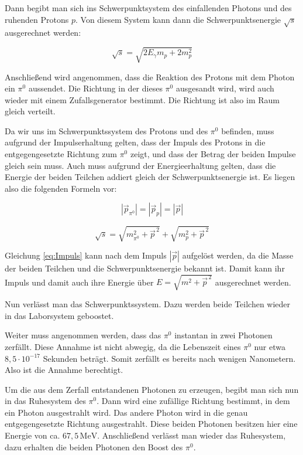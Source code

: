 \documentclass[a4paper,11pt,oneside,final,german,openbib,pdftex]{scrbook}
\begin{document}
{Dann begibt man sich ins Schwerpunktsystem des einfallenden Photons und des ruhenden Protons $p$. 
Von diesem System kann dann die Schwerpunktsenergie $\sqrt{s}$ ausgerechnet werden:

\begin{equation}
\sqrt{s}= \sqrt{2E_{\gamma}m_p+2m_p^2}
\end{equation}

Anschlie{\ss}end wird angenommen, dass die Reaktion des Protons mit dem Photon ein $\pi^0$ aussendet. Die Richtung in der dieses $\pi^0$ ausgesandt wird, wird auch wieder mit einem Zufallsgenerator bestimmt. Die Richtung ist also im Raum gleich verteilt.

Da wir uns im Schwerpunktssystem des Protons und des $\pi^0$ befinden, muss aufgrund der Impulserhaltung gelten, dass der Impuls des Protons in die entgegengesetzte Richtung zum $\pi^0$ zeigt, und dass der Betrag der beiden Impulse gleich sein muss. Auch muss aufgrund der Energieerhaltung gelten, dass die Energie der beiden Teilchen addiert gleich der Schwerpunktsenergie ist. Es liegen also die folgenden Formeln vor:


\begin{equation}
|\vec{p}_{\pi^0}|=|\vec{p}_p| = |\vec{p}| 
\end{equation}

\begin{equation}
 \sqrt{s}=\sqrt{m_{\pi^0}^2+\vec{p}^{\,2}} + \sqrt{m_{p}^2+\vec{p}^{\,2}}
\label{eq:Impuls}
\end{equation}


Gleichung \ref{eq:Impuls} kann nach dem Impuls $|\vec{p}|$ aufgel\"ost werden, da die Masse der beiden Teilchen und die Schwerpunktsenergie bekannt ist. Damit kann ihr Impuls und damit auch ihre Energie über $E=\sqrt{m^2+\vec{p}^{\,2}}$ ausgerechnet werden. 

Nun verl\"asst man das Schwerpunktssystem. Dazu werden beide Teilchen wieder in das Laborsystem geboostet.

Weiter muss angenommen werden, dass das $\pi^0$ instantan in zwei Photonen zerf\"allt. Diese Annahme ist nicht abwegig, da die Lebenszeit eines $\pi^0$ nur etwa $8,5\cdot10^{-17}$ Sekunden betr\"agt. Somit zerf\"allt es bereits nach wenigen Nanometern. Also ist die Annahme berechtigt.

Um die aus dem Zerfall entstandenen Photonen zu erzeugen, begibt man sich nun in das Ruhesystem des $\pi^0$. Dann wird eine zuf\"allige Richtung bestimmt, in dem ein Photon ausgestrahlt wird. Das andere Photon wird in die genau entgegengesetzte Richtung ausgestrahlt. Diese beiden Photonen besitzen hier eine Energie von ca. $67,5 \, \text{MeV}$. Anschlie{\ss}end verl\"asst man wieder das Ruhesystem, dazu erhalten die beiden Photonen den Boost des $\pi^0$. 
\newline


}
\end{document}
